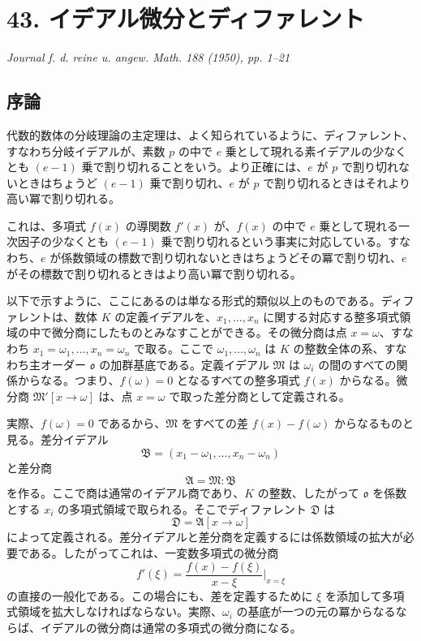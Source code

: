 
\clearpage

\section*{43. イデアル微分とディファレント}

\begin{center}
\emph{Journal f. d. reine u. angew. Math. 188 (1950), pp. 1--21}
\end{center}

\subsection*{序論}

代数的数体の分岐理論の主定理は、よく知られているように、ディファレント、すなわち分岐イデアルが、素数 \(p\) の中で \(e\) 乗として現れる素イデアルの少なくとも \((e-1)\) 乗で割り切れることをいう。より正確には、\(e\) が \(p\) で割り切れないときはちょうど \((e-1)\) 乗で割り切れ、\(e\) が \(p\) で割り切れるときはそれより高い冪で割り切れる。

これは、多項式 \(f(x)\) の導関数 \(f'(x)\) が、\(f(x)\) の中で \(e\) 乗として現れる一次因子の少なくとも \((e-1)\) 乗で割り切れるという事実に対応している。すなわち、\(e\) が係数領域の標数で割り切れないときはちょうどその冪で割り切れ、\(e\) がその標数で割り切れるときはより高い冪で割り切れる。

以下で示すように、ここにあるのは単なる形式的類似以上のものである。ディファレントは、数体 \(K\) の定義イデアルを、\(x_1,\ldots,x_n\) に関する対応する整多項式領域の中で微分商にしたものとみなすことができる。その微分商は点 \(x=\omega\)、すなわち \(x_1=\omega_1,\ldots,x_n=\omega_n\) で取る。ここで \(\omega_1,\ldots,\omega_n\) は \(K\) の整数全体の系、すなわち主オーダー \(\mathfrak o\) の加群基底である。定義イデアル \(\mathfrak M\) は \(\omega_i\) の間のすべての関係からなる。つまり、\(f(\omega)=0\) となるすべての整多項式 \(f(x)\) からなる。微分商 \(\mathfrak M'[x\to\omega]\) は、点 \(x=\omega\) で取った差分商として定義される。

実際、\(f(\omega)=0\) であるから、\(\mathfrak M\) をすべての差 \(f(x)-f(\omega)\) からなるものと見る。差分イデアル
\[
        \mathfrak B=(x_1-\omega_1,\ldots,x_n-\omega_n)
\]
と差分商
\[
        \mathfrak A=\mathfrak M:\mathfrak B
\]
を作る。ここで商は通常のイデアル商であり、\(K\) の整数、したがって \(\mathfrak o\) を係数とする \(x_i\) の多項式領域で取られる。そこでディファレント \(\mathfrak D\) は
\[
        \mathfrak D=\mathfrak A[x\to\omega]
\]
によって定義される。差分イデアルと差分商を定義するには係数領域の拡大が必要である。したがってこれは、一変数多項式の微分商
\[
        f'(\xi)=\frac{f(x)-f(\xi)}{x-\xi}\bigg|_{x=\xi}
\]
の直接の一般化である。この場合にも、差を定義するために \(\xi\) を添加して多項式領域を拡大しなければならない。実際、\(\omega_i\) の基底が一つの元の冪からなるならば、イデアルの微分商は通常の多項式の微分商になる。

